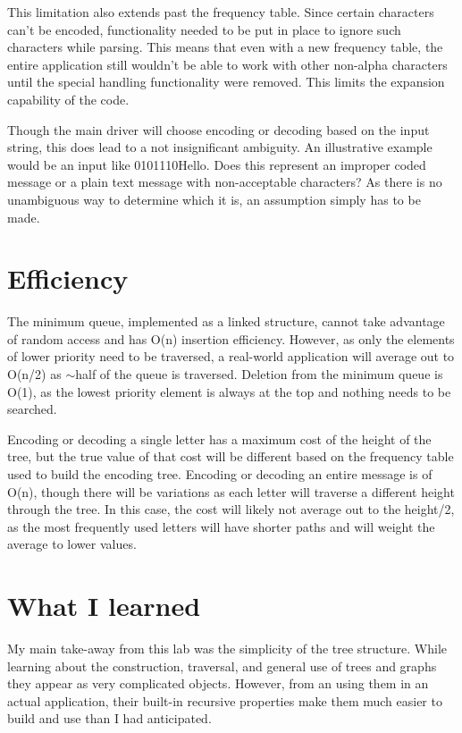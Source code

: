\documentclass[a4paper,12pt]{article}
\begin{document}
This limitation also extends past the frequency table.  Since certain characters can't be encoded, functionality needed to be put in place to ignore such characters while parsing.  This means that even with a new frequency table, the entire application still wouldn't be able to work with other non-alpha characters until the special handling functionality were removed.  This limits the expansion capability of the code.

Though the main driver will choose encoding or decoding based on the input string, this does lead to a not insignificant ambiguity.  An illustrative example would be an input like 0101110Hello.  Does this represent an improper coded message or a plain text message with non-acceptable characters?  As there is no unambiguous way to determine which it is, an assumption simply has to be made.


\section{Efficiency}
The minimum queue, implemented as a linked structure, cannot take advantage of random access and has O(n) insertion efficiency.  However, as only the elements of lower priority need to be traversed, a real-world application will average out to O(n/2) as $\sim$half of the queue is traversed.  Deletion from the minimum queue is O(1), as the lowest priority element is always at the top and nothing needs to be searched.  

Encoding or decoding a single letter has a maximum cost of the height of the tree, but the true value of that cost will be different based on the frequency table used to build the encoding tree.  Encoding or decoding an entire message is of O(n), though there will be variations as each letter will traverse a different height through the tree.  In this case, the cost will likely not average out to the height/2, as the most frequently used letters will have shorter paths and will weight the average to lower values.


\section{What I learned}
My main take-away from this lab was the simplicity of the tree structure.  While learning about the construction, traversal, and general use of trees and graphs they appear as very complicated objects.  However, from an using them in an actual application, their built-in recursive properties make them much easier to build and use than I had anticipated.  
\end{document}
